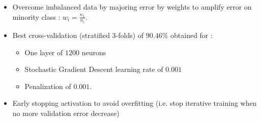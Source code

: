 \documentclass[c]{beamer}
\begin{document}
\begin{frame}
\begin{itemize}
 \item Overcome imbalanced data by majoring error by weights to amplify error on minority class : $w_i=\frac{n_1}{n_i}$.
  \item Best cross-validation (stratified 3-folds) of $90.46$\% obtained for :
  {\scriptsize
  \begin{itemize}
    \item One layer of $1200$ neurons
    \item Stochastic Gradient Descent learning rate of $0.001$ 
    \item Penalization of $0.001$. 
    \end{itemize}
  }
  \item Early stopping activation to avoid overfitting (i.e. stop iterative training when no more validation error decrease)
 \end{itemize}
\end{frame}
\end{document}
